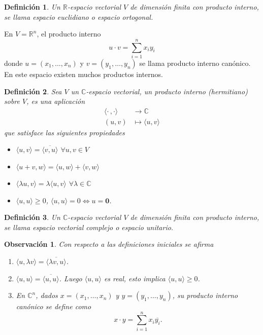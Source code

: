 \documentclass[b5paper, 11pt]{book}
\newcommand{\0}{\mathbf{0}}
\newcommand{\R}{\mathds{R}}
\newtheorem{obs}{Observación}[chapter]
\theoremstyle{estiloB}
\theoremstyle{estiloC}
\newtheorem{unadefi}{Definición}[chapter]
\theoremstyle{estiloD}
\begin{document}
\begin{unadefi}
Un $\R$-espacio vectorial $V$ de dimensión finita con producto interno, se llama espacio euclidiano o espacio ortogonal.
\end{unadefi}

En $V= \R^{n}$, el producto interno
\[
u \cdot v= \sum_{i=1}^{n}x_{i}y_{i} 
\]
donde $u=(x_{1}, \ldots, x_{n})$ y $v=(y_{1}, \ldots , y_{n})$ se llama producto interno canónico. En este espacio existen muchos productos internos.

\begin{unadefi}
Sea $V$ un $\mathds{C}$-espacio vectorial, un producto interno (hermitiano) sobre $V$, es una aplicación
\begin{align*}
\langle \mathbf{\cdot} \, , \mathbf{\cdot} \rangle	&\to \mathds{C}\\
(u,v)							&\mapsto \langle u, v \rangle
\end{align*}
que satisface las siguientes propiedades
\begin{itemize}
\item[\textit{i)}] $\langle u,v \rangle = \overline{\langle v,u\rangle}$ $\forall u,v \in V$
\item[\textit{ii)}] $\langle u+v, w \rangle= \langle u,w \rangle + \langle v,w \rangle$
\item[\textit{iii)}] $\langle \lambda u, v \rangle= \lambda \langle u,v \rangle$ $\forall \lambda \in \mathds{C}$
\item[\textit{iv)}] $\langle u,u \rangle \geq 0$, $\langle u,u \rangle=0 \Longleftrightarrow u= \0$.
\end{itemize}
\end{unadefi}

\begin{unadefi}
Un $\mathds{C}$-espacio vectorial $V$ de dimensión finita con producto interno, se llama espacio vectorial complejo o espacio unitario.
\end{unadefi}
\begin{obs}Con respecto a las definiciones iniciales se afirma
\begin{enumerate}
\item $\langle u, \lambda v \rangle= \overline{\langle \lambda v, u \rangle}$.
\item $\langle u,u \rangle= \overline{\langle u,u \rangle}$. Luego $\langle u,u \rangle$ es real, esto implica $\langle u,u \rangle \geq 0$.
\item En $\mathds{C}^{n}$, dados $x= (x_1, \ldots , x_n)$ y $y= (y_{1}, \ldots , y_{n})$, su producto interno canónico se define como
\[
x \cdot y= \sum_{i=1}^{n} x_{i}\overline{y_{i}}.
\]
\end{enumerate}
\end{obs}
\end{document}
